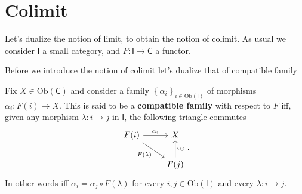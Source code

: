 \section{Colimit}
Let's dualize the notion of limit, to obtain the notion of colimit.
As usual we consider $\mathsf{I}$ a small category, and $F: \mathsf{I} \to \mathsf{C}$ a functor.

Before we introduce the notion of colimit let's dualize that of compatible family
\begin{defn}
	Fix $X \in \mathrm{Ob} \left(\mathsf{C}\right)$ and
	consider a family $\left\{ \alpha_i \right\}_{i \in \mathrm{Ob} \left(\mathsf{I}\right)}$ of morphisms $\alpha_i: F(i) \to X$.
	This is said to be a \textbf{compatible family} with respect to $F$ iff, given any morphism $\lambda: i \to j$ in $\mathsf{I}$,
	the following triangle commutes
	\begin{equation}
	\begin{tikzcd}
		F(i) \arrow[r, "\alpha_i", rightarrow] \arrow[rd, "F(\lambda)"', rightarrow] &
		X \\
		&
		F(j) \arrow[u, "\alpha_j"', rightarrow] 
	\end{tikzcd}
	.\end{equation} 
	In other words iff $\alpha_i = \alpha_j \circ F(\lambda)$ for every $i, j \in \mathrm{Ob} \left(\mathsf{I}\right)$ and every $\lambda: i \to j$.
\end{defn}

